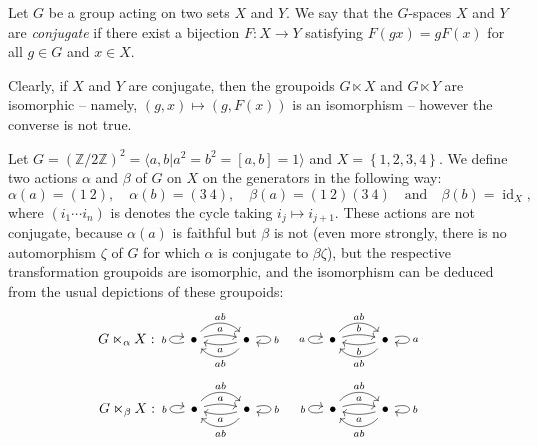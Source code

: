 \begin{example}
Let $G$ be a group acting on two sets $X$ and $Y$. We say that the $G$-spaces $X$ and $Y$ are \emph{conjugate} if there exist a bijection $F:X\to Y$ satisfying $F(gx)=g F(x)$ for all $g\in G$ and $x\in X$.

Clearly, if $X$ and $Y$ are conjugate, then the groupoids $G\ltimes X$ and $G\ltimes Y$ are isomorphic -- namely, $(g,x)\mapsto(g, F(x))$ is an isomorphism -- however the converse is not true.

Let $G=(\mathbb{Z}/2\mathbb{Z})^2=\langle a,b|a^2=b^2=[a,b]=1\rangle$ and $X=\left\{1,2,3,4\right\}$. We define two actions  $\alpha$ and $\beta$ of $G$ on $X$ on the generators in the following way:
\[\alpha(a)=(1\ 2),\quad\alpha(b)=(3\ 4),\quad\beta(a)=(1\ 2)(3\ 4)\quad\text{and}\quad\beta(b)=\operatorname{id}_X,\]
where $(i_1\cdots i_n)$ is denotes the cycle taking $i_j\mapsto i_{j+1}$. These actions are not conjugate, because $\alpha(a)$ is faithful but $\beta$ is not (even more strongly, there is no automorphism $\zeta$ of $G$ for which $\alpha$ is conjugate to $\beta\zeta$), but the respective transformation groupoids are isomorphic, and the isomorphism can be deduced from the usual depictions of these groupoids:
\[G\ltimes_\alpha X:\begin{tikzcd}
\bullet\arrow[loop left,"b"]\arrow[r,bend left=15,"a"]\arrow[r,bend left=50,"ab"]
	&\bullet\arrow[loop right,"b"]\arrow[l,bend left=15,"a"]\arrow[l,bend left=50,"ab"]
&		&\bullet\arrow[loop left,"a"]\arrow[r,bend left=15,"b"]\arrow[r,bend left=50,"ab"]
			&\bullet\arrow[loop right,"a"]\arrow[l,bend left=15,"b"]\arrow[l,bend left=50,"ab"]
\end{tikzcd}\]
\[G\ltimes_\beta X:\begin{tikzcd}
\bullet\arrow[loop left,"b"]\arrow[r,bend left=15,"a"]\arrow[r,bend left=50,"ab"]
	&\bullet\arrow[loop right,"b"]\arrow[l,bend left=15,"a"]\arrow[l,bend left=50,"ab"]
&		&\bullet\arrow[loop left,"b"]\arrow[r,bend left=15,"a"]\arrow[r,bend left=50,"ab"]
			&\bullet\arrow[loop right,"b"]\arrow[l,bend left=15,"a"]\arrow[l,bend left=50,"ab"]
\end{tikzcd}\]
\end{example}

